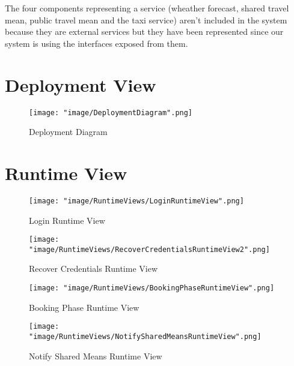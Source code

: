 The four components representing a service (wheather forecast, shared travel mean, public travel mean and the taxi service) aren't included in the system because they are external services but they have been represented since our system is using the interfaces exposed from them.

\section{Deployment View}

\begin{figure}[H]
\begin{center}
\texttt{[image: "image/DeploymentDiagram".png]}
\caption{Deployment Diagram}
\end{center}
\end{figure}

\section{Runtime View}

\begin{figure}[H]
\begin{center}
\texttt{[image: "image/RuntimeViews/LoginRuntimeView".png]}
\caption{Login Runtime View}
\end{center}
\end{figure}

\begin{figure}[H]
\begin{center}
\texttt{[image: "image/RuntimeViews/RecoverCredentialsRuntimeView2".png]}
\caption{Recover Credentials Runtime View}
\end{center}
\end{figure}

\begin{figure}[H]
\begin{center}
\texttt{[image: "image/RuntimeViews/BookingPhaseRuntimeView".png]}
\caption{Booking Phase Runtime View}
\end{center}
\end{figure}

\begin{figure}[H]
\begin{center}
\texttt{[image: "image/RuntimeViews/NotifySharedMeansRuntimeView".png]}
\caption{Notify Shared Means Runtime View}
\end{center}
\end{figure}

